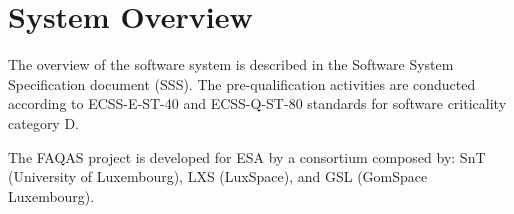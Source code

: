 \chapter{System Overview}

The overview of the software system is described in the Software System Specification document (SSS).
The pre-qualification activities are conducted according to ECSS-E-ST-40 and ECSS-Q-ST-80 standards for software criticality category D.

The FAQAS project is developed for ESA by a consortium composed by: SnT (University of Luxembourg), LXS (LuxSpace), and GSL (GomSpace Luxembourg).
\clearpage
